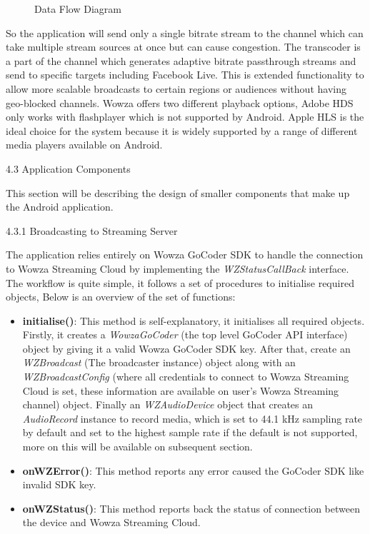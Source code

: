 \documentclass{article}
\begin{document}
\begin{flushleft}
\begin{figure}[H]
	\caption{Data Flow Diagram}
	\label{fig:data-flow-diagram}
\end{figure}
So the application will send only a single bitrate stream to the channel which can take multiple stream sources at once but can cause congestion. The transcoder is a part of the channel which generates adaptive bitrate passthrough streams and send to specific targets including Facebook Live. This is extended functionality to allow more scalable broadcasts to certain regions or audiences without having geo-blocked channels. Wowza offers two different playback options, Adobe HDS only works with flashplayer which is not supported by Android. Apple HLS is the ideal choice for the system because it is widely supported by a range of different media players available on Android.\par
{\Large 4.3 Application Components}\par
This section will be describing the design of smaller components that make up the Android application.\par
{\large 4.3.1 Broadcasting to Streaming Server}\par
The application relies entirely on Wowza GoCoder SDK to handle the connection to Wowza Streaming Cloud by implementing the \textit{WZStatusCallBack} interface. The workflow is quite simple, it follows a set of procedures to initialise required objects, Below is an overview of the set of functions:
\begin{itemize}
	\item \textbf{initialise()}: This method is self-explanatory, it initialises all required objects. Firstly, it creates a \textit{WowzaGoCoder} (the top level GoCoder API interface) object by giving it a valid Wowza GoCoder SDK key. After that, create an \textit{WZBroadcast} (The broadcaster instance) object along with an \textit{WZBroadcastConfig} (where all credentials to connect to Wowza Streaming Cloud is set, these information are available on user's Wowza Streaming channel) object. Finally an \textit{WZAudioDevice} object that creates an \textit{AudioRecord} instance to record media, which is set to 44.1 kHz sampling rate by default and set to the highest sample rate if the default is not supported, more on this will be available on subsequent section.\\
	\item \textbf{onWZError()}: This method reports any error caused the GoCoder SDK like invalid SDK key.\\
	\item \textbf{onWZStatus()}: This method reports back the status of connection between the device and Wowza Streaming Cloud.\\

\end{itemize}
\end{flushleft}
\end{document}
